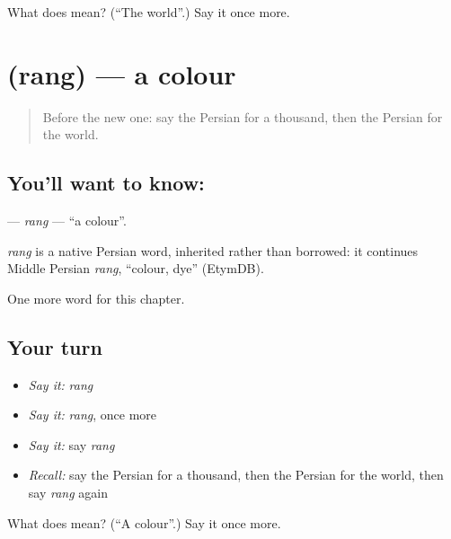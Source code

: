 \begin{tcolorbox}[breakable,colback=teal!4,colframe=teal!35!black,title={Before you move on}]
What does  mean? (\textquotedblleft{}The world\textquotedblright{}.) Say it once more.
\end{tcolorbox}
\section[\texorpdfstring{\fa{رنگ} (rang)}{رنگ (rang)}]{ (rang) — a colour}

\label{lesson:FA-C77-rang}



\begin{quote}
Before the new one: say the Persian for a thousand, then the Persian for the world.
\end{quote}

\subsection*{You'll want to know: }
\textbf{} — \emph{rang} — \textquotedblleft{}a colour\textquotedblright{}.

\begin{cousinweb}
\emph{rang} is a native Persian word, inherited rather than borrowed: it continues Middle Persian \emph{rang}, \textquotedblleft{}colour, dye\textquotedblright{} (EtymDB).
\end{cousinweb}

\begin{grammarlens}[title={What you've built}]
One more word for this chapter.
\end{grammarlens}

\subsection*{Your turn}
\begin{itemize}
\raggedright
  \item \emph{Say it:} \emph{rang}
  \item \emph{Say it:} \emph{rang}, once more
  \item \emph{Say it:} say \emph{rang}
  \item \emph{Recall:} say the Persian for a thousand, then the Persian for the world, then say \emph{rang} again
\end{itemize}

\begin{tcolorbox}[breakable,colback=teal!4,colframe=teal!35!black,title={Before you move on}]
What does  mean? (\textquotedblleft{}A colour\textquotedblright{}.) Say it once more.
\end{tcolorbox}
